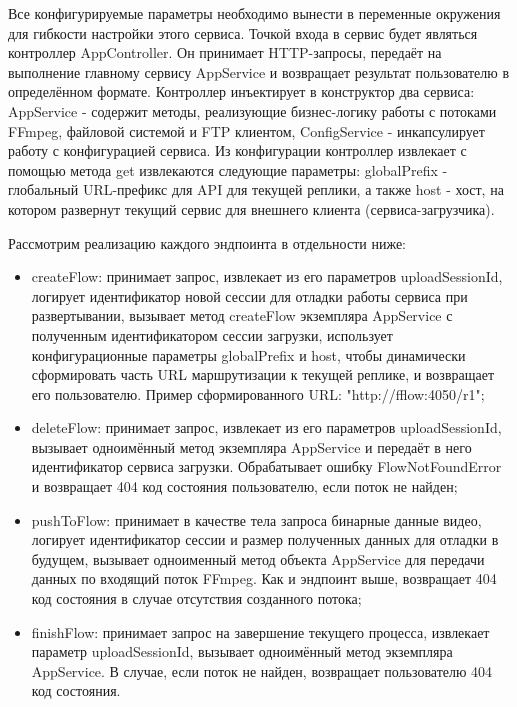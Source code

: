 	Все конфигурируемые параметры необходимо вынести в переменные окружения для гибкости настройки этого сервиса.
	Точкой входа в сервис будет являться контроллер AppController. Он принимает HTTP-запросы, передаёт на выполнение главному сервису AppService и возвращает результат пользователю в определённом формате. Контроллер инъектирует в конструктор два сервиса: AppService - содержит методы, реализующие бизнес-логику работы с потоками FFmpeg, файловой системой и FTP клиентом, ConfigService - инкапсулирует работу с конфигурацией сервиса. Из конфигурации контроллер извлекает с помощью метода get извлекаются следующие параметры: globalPrefix - глобальный URL-префикс для API для текущей реплики, а также host - хост, на котором развернут текущий сервис для внешнего клиента (сервиса-загрузчика).
	
	Рассмотрим реализацию каждого эндпоинта в отдельности ниже:
	
	\begin{itemize}[label=$\bullet$]
		\item createFlow: принимает запрос, извлекает из его параметров uploadSessionId, логирует идентификатор новой сессии для отладки работы сервиса при развертывании, вызывает метод createFlow экземпляра AppService с полученным идентификатором сессии загрузки, использует конфигурационные параметры globalPrefix и host, чтобы динамически сформировать часть URL маршрутизации к текущей реплике, и возвращает его пользователю. Пример сформированного URL: "http://fflow:4050/r1";
		\item deleteFlow: принимает запрос, извлекает из его параметров uploadSessionId, вызывает одноимённый метод экземпляра AppService и передаёт в него идентификатор сервиса загрузки. Обрабатывает ошибку FlowNotFoundError и возвращает 404 код состояния пользователю, если поток не найден;
		\item pushToFlow: принимает в качестве тела запроса бинарные данные видео, логирует идентификатор сессии и размер полученных данных для отладки в будущем, вызывает одноименный метод объекта AppService для передачи данных по входящий поток FFmpeg. Как и эндпоинт выше, возвращает 404 код состояния в случае отсутствия созданного потока;
		\item finishFlow: принимает запрос на завершение текущего процесса, извлекает параметр uploadSessionId, вызывает одноимённый метод экземпляра AppService. В случае, если поток не найден, возвращает пользователю 404 код состояния.
	\end{itemize}

